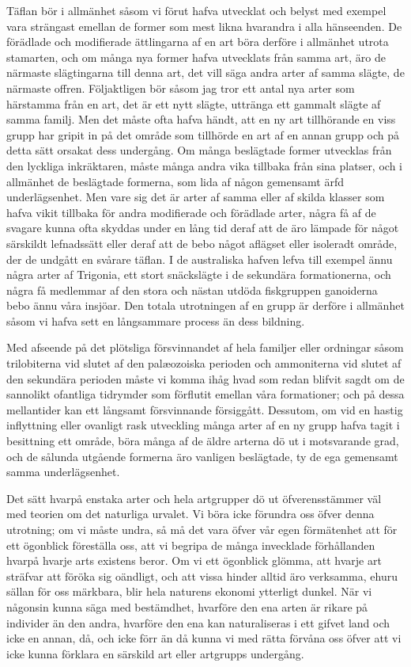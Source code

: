 Täflan bör i allmänhet såsom vi förut hafva utvecklat och belyst med exempel vara strängast emellan de former som mest likna hvarandra i alla hänseenden. De förädlade och modifierade ättlingarna af en art böra derföre i allmänhet utrota stamarten, och om många nya former hafva utvecklats från samma art, äro de närmaste slägtingarna till denna art, det vill säga andra arter af samma slägte, de närmaste offren. Följaktligen bör såsom jag tror ett antal nya arter som härstamma från en art, det är ett nytt slägte, uttränga ett gammalt slägte af samma familj. Men det måste ofta hafva händt, att en ny art tillhörande en viss grupp har gripit in på det område som tillhörde en art af en annan grupp och på detta sätt orsakat dess undergång. Om många beslägtade former utvecklas från den lyckliga inkräktaren, måste många andra vika tillbaka från sina platser, och i allmänhet de beslägtade formerna, som lida af någon gemensamt ärfd underlägsenhet. Men vare sig det är arter af samma eller af skilda klasser som hafva vikit tillbaka för andra modifierade och förädlade arter, några få af de svagare kunna ofta skyddas under en lång tid deraf att de äro lämpade för något särskildt lefnadssätt eller deraf att de bebo något aflägset eller isoleradt område, der de undgått en svårare täflan. I de australiska hafven lefva till exempel ännu några arter af Trigonia, ett stort snäckslägte i de sekundära formationerna, och några få medlemmar af den stora och nästan utdöda fiskgruppen ganoiderna bebo ännu våra insjöar. Den totala utrotningen af en grupp är derföre i allmänhet såsom vi hafva sett en långsammare process än dess bildning.

Med afseende på det plötsliga försvinnandet af hela familjer eller ordningar såsom trilobiterna vid slutet af den palæozoiska perioden och ammoniterna vid slutet af den sekundära perioden måste vi komma ihåg hvad som redan blifvit sagdt om de sannolikt ofantliga tidrymder som förflutit emellan våra formationer; och på dessa mellantider kan ett långsamt försvinnande försiggått. Dessutom, om vid en hastig inflyttning eller ovanligt rask utveckling många arter af en ny grupp hafva tagit i besittning ett område, böra många af de äldre arterna dö ut i motsvarande grad, och de sålunda utgående formerna äro vanligen beslägtade, ty de ega gemensamt samma underlägsenhet.

Det sätt hvarpå enstaka arter och hela artgrupper dö ut öfverensstämmer väl med teorien om det naturliga urvalet. Vi böra icke förundra oss öfver denna utrotning; om vi måste undra, så må det vara öfver vår egen förmätenhet att för ett ögonblick föreställa oss, att vi begripa de många invecklade förhållanden hvarpå hvarje arts existens beror. Om vi ett ögonblick glömma, att hvarje art sträfvar att föröka sig oändligt, och att vissa hinder alltid äro verksamma, ehuru sällan för oss märkbara, blir hela naturens ekonomi ytterligt dunkel. När vi någonsin kunna säga med bestämdhet, hvarföre den ena arten är rikare på individer än den andra, hvarföre den ena kan naturaliseras i ett gifvet land och icke en annan, då, och icke förr än då kunna vi med rätta förvåna oss öfver att vi icke kunna förklara en särskild art eller artgrupps undergång.

